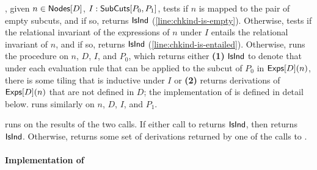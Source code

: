 \chkindaux, given $n \in \mathsf{Nodes}[ D ]$, $I : \mathsf{SubCuts}[ P_0, P_1 ]$,
tests if $n$ is mapped to the pair of empty subcuts, and if so,
returns $\mathsf{IsInd}$ (\autoref{line:chkind-is-empty}).
%
Otherwise, \chkindaux tests if the relational invariant of the
expressions of $n$ under $I$ entails the relational invariant of $n$,
and if so, returns $\mathsf{IsInd}$ (\autoref{line:chkind-is-entailed}).
%
Otherwise, \chkindaux runs the procedure \unwind on $n$, $D$, $I$,
and $P_0$, which returns either \textbf{(1)} $\mathsf{IsInd}$ to denote that
under each evaluation rule that can be applied to the subcut of $P_0$
%
%
in $\mathsf{Exps}[ D ](n)$, there is some tiling that is inductive under
$I$ or %
\textbf{(2)} returns derivations of $\mathsf{Exps}[ D ](n)$ that are not
defined in $D$;
%
the implementation of \unwind is defined in detail below.
%
\chkindaux runs \unwind similarly on $n$, $D$, $I$, and $P_1$.

\chkindaux runs \chooseres on the results of the two calls.
%
If either call to \unwind returns $\mathsf{IsInd}$, then \chooseres returns
$\mathsf{IsInd}$.
%
Otherwise, \chooseres returns some set of derivations returned by one
of the calls to \unwind.

\paragraph{Implementation of \unwind}

